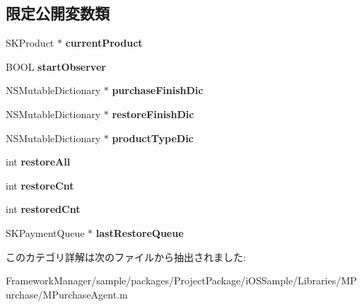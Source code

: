 \subsection*{限定公開変数類}
\begin{DoxyCompactItemize}
\item 
\hypertarget{category_m_purchase_agent_07_08_a2bf7db8eb30a97012c730ae081f0631c}{}S\+K\+Product $\ast$ {\bfseries current\+Product}\label{category_m_purchase_agent_07_08_a2bf7db8eb30a97012c730ae081f0631c}

\item 
\hypertarget{category_m_purchase_agent_07_08_ae89c420a0a25e74f69f73e07e5b4a003}{}B\+O\+O\+L {\bfseries start\+Observer}\label{category_m_purchase_agent_07_08_ae89c420a0a25e74f69f73e07e5b4a003}

\item 
\hypertarget{category_m_purchase_agent_07_08_a3c6bf340a5f460eb6393b6d76f73a9dd}{}N\+S\+Mutable\+Dictionary $\ast$ {\bfseries purchase\+Finish\+Dic}\label{category_m_purchase_agent_07_08_a3c6bf340a5f460eb6393b6d76f73a9dd}

\item 
\hypertarget{category_m_purchase_agent_07_08_a64531e997f13f4b00f83f4cb092b321a}{}N\+S\+Mutable\+Dictionary $\ast$ {\bfseries restore\+Finish\+Dic}\label{category_m_purchase_agent_07_08_a64531e997f13f4b00f83f4cb092b321a}

\item 
\hypertarget{category_m_purchase_agent_07_08_ad841e6b250f99c1b512dc900be510938}{}N\+S\+Mutable\+Dictionary $\ast$ {\bfseries product\+Type\+Dic}\label{category_m_purchase_agent_07_08_ad841e6b250f99c1b512dc900be510938}

\item 
\hypertarget{category_m_purchase_agent_07_08_a7794d638f9f2c555113c5b5f03b0a6e0}{}int {\bfseries restore\+All}\label{category_m_purchase_agent_07_08_a7794d638f9f2c555113c5b5f03b0a6e0}

\item 
\hypertarget{category_m_purchase_agent_07_08_ad313506bb8f958b02b9f9c61bae32fdf}{}int {\bfseries restore\+Cnt}\label{category_m_purchase_agent_07_08_ad313506bb8f958b02b9f9c61bae32fdf}

\item 
\hypertarget{category_m_purchase_agent_07_08_a8307b939e2899af2bf048bcdf23d4730}{}int {\bfseries restored\+Cnt}\label{category_m_purchase_agent_07_08_a8307b939e2899af2bf048bcdf23d4730}

\item 
\hypertarget{category_m_purchase_agent_07_08_a0c5ac27d1200cef7701ceb3acd43968a}{}S\+K\+Payment\+Queue $\ast$ {\bfseries last\+Restore\+Queue}\label{category_m_purchase_agent_07_08_a0c5ac27d1200cef7701ceb3acd43968a}

\end{DoxyCompactItemize}


このカテゴリ詳解は次のファイルから抽出されました\+:\begin{DoxyCompactItemize}
\item 
Framework\+Manager/sample/packages/\+Project\+Package/i\+O\+S\+Sample/\+Libraries/\+M\+Purchase/M\+Purchase\+Agent.\+m\end{DoxyCompactItemize}
